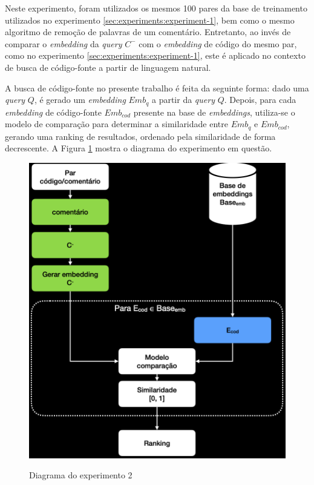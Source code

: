 Neste experimento, foram utilizados os mesmos 100 pares da base de treinamento utilizados no experimento \ref{sec:experiments:experiment-1}, bem como o mesmo algoritmo de remoção de palavras de um comentário. Entretanto, ao invés de comparar o \textit{embedding} da \textit{query} $C^-$ com o \textit{embedding} de código do mesmo par, como no experimento \ref{sec:experiments:experiment-1}, este é aplicado no contexto de busca de código-fonte a partir de linguagem natural.

A busca de código-fonte no presente trabalho é feita da seguinte forma: dado uma \textit{query} $Q$, é gerado um \textit{embedding} $Emb_q$ a partir da \textit{query} $Q$. Depois, para cada \textit{embedding} de código-fonte $Emb_{cod}$ presente na base de \textit{embeddings}, utiliza-se o modelo de comparação para determinar a similaridade entre $Emb_q$ e $Emb_{cod}$, gerando uma ranking de resultados, ordenado pela similaridade de forma decrescente. A Figura \ref{fig:experiment-2-diagram} mostra o diagrama do experimento em questão.

\begin{figure}[H]
    \centering
        \caption{Diagrama do experimento 2}
        \includegraphics[scale=0.4]{imagens/proposta-experimental/experiment-2.png}
        \label{fig:experiment-2-diagram}
\end{figure}

